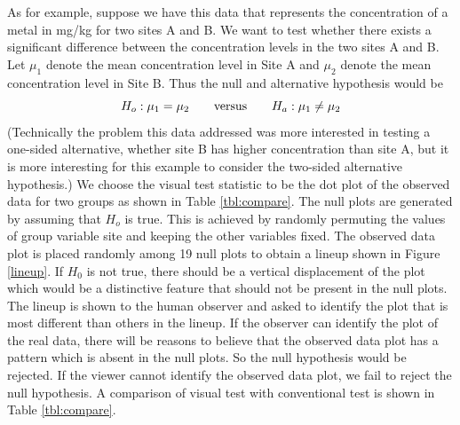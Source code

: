 As for example, suppose we have this data that represents the concentration of a metal in mg/kg for two sites A and B.
We want to test whether there exists a significant difference between the concentration levels in the two sites A and B. Let $\mu_1$ denote the mean concentration level in Site A and $\mu_2$ denote the mean concentration level in Site B. Thus the null and alternative hypothesis would be
\[
H_o: \mu_1 = \mu_2 \qquad \hbox{versus} \qquad H_a: \mu_1 \ne \mu_2
\]
(Technically the problem this data addressed was more interested in testing a one-sided alternative, whether site B has higher concentration than site A, but it is more interesting for this example to consider the two-sided alternative hypothesis.) We choose the visual test statistic to be the dot plot of the observed data for two groups as shown in Table \ref{tbl:compare}. The null plots are generated by assuming that $H_o$ is true. This is achieved by randomly permuting the values of group variable site and keeping the other variables fixed. The observed data plot is placed randomly among 19 null plots to obtain a lineup shown in Figure \ref{lineup}. If $H_0$ is not true, there should be a vertical displacement of the plot which would be a distinctive feature that should not be present in the null plots. The lineup is shown to the human observer and asked to identify the plot that is most different than others in the lineup. If the observer can identify the plot of the real data, there will be reasons to believe that the observed data plot has a pattern which is absent in the null plots. So the null hypothesis would be rejected. If the viewer cannot identify the observed data plot, we fail to reject the null hypothesis. A comparison of visual test with conventional test is shown in Table \ref{tbl:compare}.

